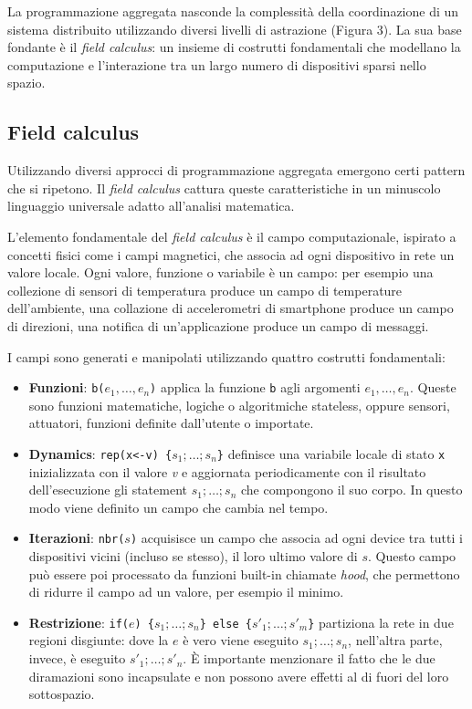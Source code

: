 La programmazione aggregata nasconde la complessità della coordinazione di un
sistema distribuito utilizzando diversi livelli di astrazione (Figura 3). La sua base
fondante è il \textit{field calculus}: un insieme di costrutti fondamentali che
modellano la computazione e l'interazione tra un largo numero di dispositivi
sparsi nello spazio.

\subsection{Field calculus}
Utilizzando diversi approcci di programmazione aggregata emergono certi pattern
che si ripetono. Il \textit{field calculus}
\cite{Viroli2013} cattura queste caratteristiche in un
minuscolo linguaggio universale adatto all'analisi matematica.

L'elemento fondamentale del \textit{field calculus} è il campo computazionale,
ispirato a concetti fisici come i campi magnetici, che associa ad ogni
dispositivo in rete un valore locale. Ogni valore, funzione o variabile è un
campo: per esempio una collezione di sensori di temperatura produce un campo di
temperature dell'ambiente, una collazione di accelerometri di smartphone produce
un campo di direzioni, una notifica di un'applicazione produce un campo di
messaggi.

I campi sono generati e manipolati utilizzando quattro costrutti fondamentali:
\begin{itemize}
\item \textbf{Funzioni}: \texttt{b($e_1,\ldots, e_n$)} applica la funzione \texttt{b}
  agli argomenti \texttt{$e_1,\ldots, e_n$}. Queste sono funzioni matematiche,
  logiche o algoritmiche stateless, oppure sensori, attuatori, funzioni definite
  dall'utente o importate.

\item \textbf{Dynamics}: \texttt{rep(x<-v) \{$s_1;\ldots;s_n$\}} definisce una variabile
  locale di stato \texttt{x} inizializzata con il valore \textit{v} e aggiornata
  periodicamente con il risultato dell'esecuzione gli statement
  \texttt{{$s_1;\ldots;s_n$}} che compongono il suo corpo. In questo modo viene
  definito un campo che cambia nel tempo.

\item \textbf{Iterazioni}: \texttt{nbr($s$)} acquisisce un campo che associa ad ogni
  device tra tutti i dispositivi vicini (incluso se stesso), il loro ultimo
  valore di \texttt{$s$}. Questo campo può essere poi processato da funzioni
  built-in chiamate \textit{hood}, che permettono di ridurre il campo ad un
  valore, per esempio il minimo.

\item \textbf{Restrizione}: \texttt{if($e$) \{$s_1;\ldots;s_n$\} else
    \{$s'_1;\ldots;s'_m$\}} partiziona la rete in due regioni disgiunte: dove la
  \texttt{$e$} è vero viene eseguito \texttt{$s_1;\ldots;s_n$}, nell'altra parte,
  invece, è eseguito \texttt{$s'_1;\ldots;s'_n$}. È importante menzionare il
  fatto che le due diramazioni sono incapsulate e non possono avere effetti al
  di fuori del loro sottospazio.
\end{itemize}

